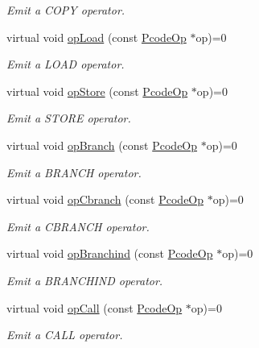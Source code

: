 \begin{DoxyCompactItemize}
\begin{DoxyCompactList}\small\item\em Emit a C\+O\+PY operator. \end{DoxyCompactList}\item 
virtual void \mbox{\hyperlink{class_print_language_a0541c75a6e336c48f2a52318eee7a49c}{op\+Load}} (const \mbox{\hyperlink{class_pcode_op}{Pcode\+Op}} $\ast$op)=0
\begin{DoxyCompactList}\small\item\em Emit a L\+O\+AD operator. \end{DoxyCompactList}\item 
virtual void \mbox{\hyperlink{class_print_language_a138cf7e68730a9f70b9177fe156afb68}{op\+Store}} (const \mbox{\hyperlink{class_pcode_op}{Pcode\+Op}} $\ast$op)=0
\begin{DoxyCompactList}\small\item\em Emit a S\+T\+O\+RE operator. \end{DoxyCompactList}\item 
virtual void \mbox{\hyperlink{class_print_language_a051bb5694c4e0ed5378a22464d2f36b3}{op\+Branch}} (const \mbox{\hyperlink{class_pcode_op}{Pcode\+Op}} $\ast$op)=0
\begin{DoxyCompactList}\small\item\em Emit a B\+R\+A\+N\+CH operator. \end{DoxyCompactList}\item 
virtual void \mbox{\hyperlink{class_print_language_a4e48bbb4698901688261bdbc244d0ca4}{op\+Cbranch}} (const \mbox{\hyperlink{class_pcode_op}{Pcode\+Op}} $\ast$op)=0
\begin{DoxyCompactList}\small\item\em Emit a C\+B\+R\+A\+N\+CH operator. \end{DoxyCompactList}\item 
virtual void \mbox{\hyperlink{class_print_language_a68e40449487d9d6b315afe8808e8c986}{op\+Branchind}} (const \mbox{\hyperlink{class_pcode_op}{Pcode\+Op}} $\ast$op)=0
\begin{DoxyCompactList}\small\item\em Emit a B\+R\+A\+N\+C\+H\+I\+ND operator. \end{DoxyCompactList}\item 
virtual void \mbox{\hyperlink{class_print_language_afa93e63c2334402972bb2c783f5b4602}{op\+Call}} (const \mbox{\hyperlink{class_pcode_op}{Pcode\+Op}} $\ast$op)=0
\begin{DoxyCompactList}\small\item\em Emit a C\+A\+LL operator. \end{DoxyCompactList}\item 

\end{DoxyCompactItemize}
